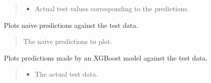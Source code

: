 \documentclass[letterpaper,10pt,english]{sphinxmanual}
\begin{document}
\begin{fulllineitems}
\begin{fulllineitems}
\begin{quote}
\begin{description}
\begin{itemize}
\item {} 
\sphinxAtStartPar
{} \textendash{} Actual test values corresponding to the predictions.

\end{itemize}

\end{description}\end{quote}

\end{fulllineitems}


\begin{fulllineitems}
\label{\detokenize{docs/model_testing:model_testing.ModelTest.NAIVE_plot_pred}}
\pysigstartsignatures
{}
\pysigstopsignatures
\sphinxAtStartPar
Plots naive predictions against the test data.
\begin{quote}\begin{description}
\sphinxAtStartPar
{} \textendash{} The naive predictions to plot.

\end{description}\end{quote}

\end{fulllineitems}


\begin{fulllineitems}
\label{\detokenize{docs/model_testing:model_testing.ModelTest.XGB_plot_pred}}
\pysigstartsignatures
{}
\pysigstopsignatures
\sphinxAtStartPar
Plots predictions made by an XGBoost model against the test data.
\begin{quote}\begin{description}
\begin{itemize}
\item {} 
\sphinxAtStartPar
{} \textendash{} The actual test data.


\end{itemize}
\end{description}
\end{quote}
\end{fulllineitems}
\end{fulllineitems}
\end{document}
